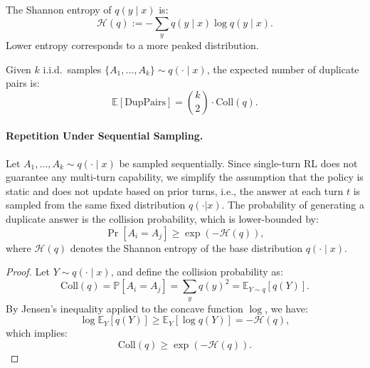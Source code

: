 \begin{definition}[Entropy]
The Shannon entropy of $q(y \mid x)$ is:
\[
\mathcal{H}(q) := -\sum_y q(y \mid x) \log q(y \mid x).
\]
Lower entropy corresponds to a more peaked distribution.
\end{definition}

\begin{definition}
Given $k$ i.i.d.\ samples $\{A_1, \dots, A_k\} \sim q(\cdot \mid x)$, the expected number of duplicate pairs is:
\[
\mathbb{E}[\mathrm{DupPairs}] = \binom{k}{2} \cdot \mathrm{Coll}(q).
\]
\end{definition}

\paragraph{Repetition Under Sequential Sampling.}
\begin{proposition}
\label{prop:collision-entropy}
Let $A_1, \dots, A_k \sim q(\cdot \mid x)$ be sampled sequentially.
Since single-turn RL does not guarantee any multi-turn capability, we simplify the assumption that the policy is static and does not update based on prior turns, i.e., the answer at each turn $t$ is sampled from the same fixed distribution $q(\cdot | x)$. The probability of generating a duplicate answer is the collision probability, which is lower-bounded by:
\[
\Pr[A_i = A_j] \ge \exp(-\mathcal{H}(q)),
\]
where $\mathcal{H}(q)$ denotes the Shannon entropy of the base distribution $q(\cdot \mid x)$.
\end{proposition}


\begin{proof}
Let \( Y \sim q(\cdot \mid x) \), and define the collision probability as:
\[
\mathrm{Coll}(q) = \mathbb{P}[A_i = A_j] = \sum_y q(y)^2 = \mathbb{E}_{Y \sim q}[q(Y)].
\]
By Jensen’s inequality applied to the concave function \( \log \), we have:
\[
\log \mathbb{E}_{Y}[q(Y)] \ge \mathbb{E}_{Y}[\log q(Y)] = -\mathcal{H}(q),
\]
which implies:
\[
\mathrm{Coll}(q) \ge \exp(-\mathcal{H}(q)).
\]
\end{proof}

